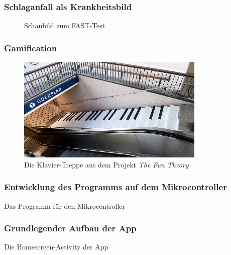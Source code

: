 \renewcommand{\thesubsection}{\arabic{subsection}}
\setcounter{subsection}{2}
\tocless\subsubsection{Schlaganfall als Krankheitsbild}
\begin{figure}[H]
\centering

\caption{Schaubild zum FAST-Test}
\label{fig:fasttest}
\end{figure}

\setcounter{subsection}{3}
\setcounter{subsubsection}{0}
\tocless\subsubsection{Gamification}
\begin{figure}[H]
\centering
\includegraphics[width=0.8\textwidth]{pics/pianostairs.jpg}
\caption{Die Klavier-Treppe aus dem Projekt \emph{The Fun Theory}}
\label{fig:pianostairs}
\end{figure}


\setcounter{subsection}{4}
\setcounter{subsubsection}{1}
\tocless\subsubsection{Entwicklung des Programms auf dem Mikrocontroller}
\renewcommand{\listingscaption}{Quellcode}
 \begin{longlisting}
 \caption{Das Programm für den Mikrocontroller}
 \label{listing:mikrocontroller}
 \end{longlisting}
 
\setcounter{subsection}{5}
\setcounter{subsubsection}{0}
\tocless\subsubsection{Grundlegender Aufbau der App}
 \begin{longlisting}
 \caption{Die Homescreen-Activity der App}
 \end{longlisting}